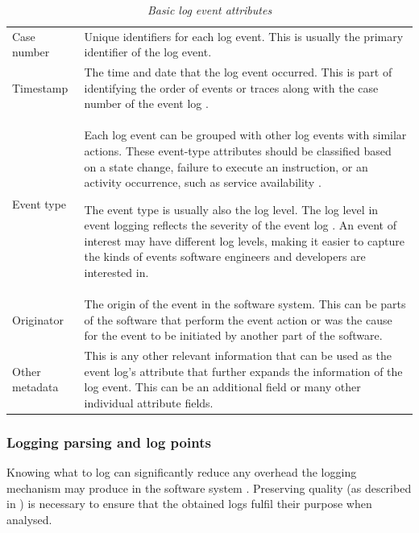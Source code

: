 \begin{table}[!htb]
	\centering
	\caption[Basic log event attributes]
	{\textit{Basic log event attributes \cite{Bekeneva2020}}}
	\label{tbl:ch1_logBasicAttributes}
	\begin{tabularx}{\textwidth}{lX}
		\toprule 
		\thead{Attribute} & \thead{Description} \\
		\midrule

		\rowcolor{lightgray}
		Case number & Unique identifiers for each log event. This is usually the primary identifier of the log event. \\

		Timestamp & The time and date that the log event occurred. This is part of identifying the order of events or traces along with the case number of the event log \cite{Kherbouche2017}. \\

		\rowcolor{lightgray}
		Event type & Each log event can be grouped with other log events with similar actions. These event-type attributes should be classified based on a state change, failure to execute an instruction, or an activity occurrence, such as service availability \cite{Fedaghi2010}. \par The event type is usually also the log level. The log level in event logging reflects the severity of the event log \cite{Rong2020}. An event of interest may have different log levels, making it easier to capture the kinds of events software engineers and developers are interested in. \\

		Originator & The origin of the event in the software system. This can be parts of the software that perform the event action or was the cause for the event to be initiated by another part of the software. \\

		\rowcolor{lightgray}
		Other metadata & This is any other relevant information that can be used as the event log's attribute that further expands the information of the log event. This can be an additional field or many other individual attribute fields.\\
		\bottomrule
	\end{tabularx}
\end{table}

\clearpage

\subsubsection{Logging parsing and log points}\label{sec:ch1_loggignPoints}
Knowing what to log can significantly reduce any overhead the logging mechanism may produce in the software system \cite{Jia2018, Pecchia2015}. Preserving quality (as described in ) is necessary to ensure that the obtained logs fulfil their purpose when analysed.

